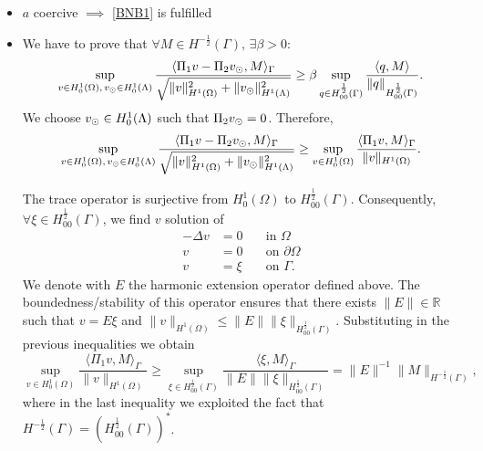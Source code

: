 \begin{itemize}
\item $a$ coercive $\implies$ \eqref{BNB1} is fulfilled

\item We have to prove that $\forall M \in H^{-\frac 12}(\Gamma),\, \exists \beta >0$:
\begin{equation*}
\sup _{v\in H^1_0(\Omega),\, v_{\odot} \in H^1_0(\Lambda)} \frac{ \langle \Pi_1 v  - \Pi_2 v_{\odot}, M \rangle_\Gamma}{\sqrt{\|v\|^2_{H^1(\Omega)}+\|v_{\odot} \|^2_{H^1(\Lambda)}}}\geq \beta \sup_{q\in H^{\frac 12}_{00}(\Gamma)}\frac{\langle q, M\rangle}{\|q\|_{H^{\frac 12}_{00}(\Gamma)}}.
\end{equation*}
We choose $v_{\odot} \in H^1_0(\Lambda)$ such that $\Pi _2v_{\odot} =0$. Therefore,
\begin{equation*}
\sup _{v\in H^1_0(\Omega),\, v_{\odot} \in H^1_0(\Lambda)} \frac{ \langle \Pi_1 v  - \Pi_2 v_{\odot}, M \rangle_\Gamma}{\sqrt{\|v\|^2_{H^1(\Omega)}+\|v_{\odot} \|^2_{H^1(\Lambda)}}} 
\geq \sup _{v\in H^1_0(\Omega)} \frac{ \langle \Pi_1 v, M \rangle_\Gamma}{\|v\|_{H^1(\Omega)}}.
\end{equation*}

The trace operator is surjective from $H^1_0(\Omega)$ to $H^{\frac12}_{00}(\Gamma)$. Consequently, $\forall \xi \in H^{\frac 12}_{00}(\Gamma)$, we find $v$ solution of
\begin{eqnarray*}
-\Delta v&=0 \quad &\text{in }\Omega\\
v&=0 &\text{on }\partial \Omega\\
v&=\xi &\text{on } \Gamma. 
\end{eqnarray*}
We denote with $E$ the harmonic extension operator defined above.
The boundedness/stability of this operator ensures that there exists $\| E \| \in \mathbb{R}$ such that
$v=E\xi $ and $\|v \|_{H^1(\Omega)}\leq \|E\| \|\xi \|_{H^{\frac 12}_{00}(\Gamma)}$. 
Substituting in the previous inequalities we obtain
\begin{equation*}
\sup _{v\in H^1_0(\Omega)} \frac{ \langle \Pi_1 v, M \rangle_\Gamma}{\|v\|_{H^1(\Omega)}}
\geq  \sup _{\xi \in H^{\frac 12}_{00}(\Gamma )} \frac{ \langle \xi , M \rangle_\Gamma}{\|E\| \|\xi\|_{H^{\frac 12}_{00}(\Gamma)}}
= \|E\|^{-1} \|M\|_{H^{-\frac 12}(\Gamma)},
\end{equation*}
where in the last inequality we exploited the fact that $H^{-\frac 12}(\Gamma)=(H^{\frac 12 }_{00}(\Gamma))^*$.
\end{itemize}


